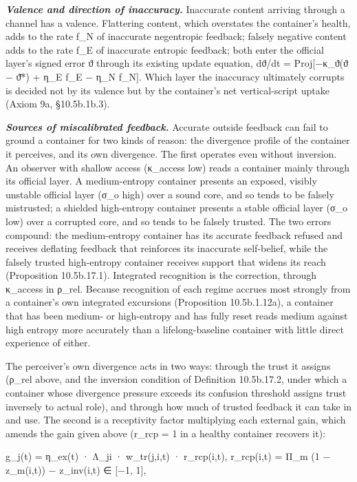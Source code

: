 \documentclass[
]{article}
\begin{document}
\emph{\textbf{Valence and direction of inaccuracy.}} Inaccurate content
arriving through a channel has a valence. Flattering content, which
overstates the container's health, adds to the rate f\_N of inaccurate
negentropic feedback; falsely negative content adds to the rate f\_E of
inaccurate entropic feedback; both enter the official layer's signed
error ϑ through its existing update equation, dϑ/dt = Proj{[}−κ\_ϑ(ϑ −
ϑ̄*) + η\_E f\_E − η\_N f\_N{]}. Which layer the inaccuracy ultimately
corrupts is decided not by its valence but by the container's net
vertical-script uptake (Axiom 9a, §10.5b.1b.3).

\emph{\textbf{Sources of miscalibrated feedback.}} Accurate outside
feedback can fail to ground a container for two kinds of reason: the
divergence profile of the container it perceives, and its own
divergence. The first operates even without inversion. An observer with
shallow access (κ\_access low) reads a container mainly through its
official layer. A medium-entropy container presents an exposed, visibly
unstable official layer (σ\_o high) over a sound core, and so tends to
be falsely mistrusted; a shielded high-entropy container presents a
stable official layer (σ\_o low) over a corrupted core, and so tends to
be falsely trusted. The two errors compound: the medium-entropy
container has its accurate feedback refused and receives deflating
feedback that reinforces its inaccurate self-belief, while the falsely
trusted high-entropy container receives support that widens its reach
(Proposition 10.5b.17.1). Integrated recognition is the correction,
through κ\_access in ρ\_rel. Because recognition of each regime accrues
most strongly from a container's own integrated excursions (Proposition
10.5b.1.12a), a container that has been medium- or high-entropy and has
fully reset reads medium against high entropy more accurately than a
lifelong-baseline container with little direct experience of either.

The perceiver's own divergence acts in two ways: through the trust it
assigns (ρ\_rel above, and the inversion condition of Definition
10.5b.17.2, under which a container whose divergence pressure exceeds
its confusion threshold assigns trust inversely to actual role), and
through how much of trusted feedback it can take in and use. The second
is a receptivity factor multiplying each external gain, which amends the
gain given above (r\_rcp = 1 in a healthy container recovers it):

g\_j(t) = η\_ex(t) · Λ\_ji · w\_tr(j,i,t) · r\_rcp(i,t), r\_rcp(i,t) =
Π\_m (1 − z\_m(i,t)) − z\_inv(i,t) ∈ {[}−1, 1{]},
\end{document}
